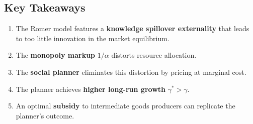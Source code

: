 \subsection{Key Takeaways}

\begin{enumerate}
    \item The Romer model features a \textbf{knowledge spillover externality} that
          leads to too little innovation in the market equilibrium.
    \item The \textbf{monopoly markup} $1/\alpha$ distorts resource allocation.
    \item The \textbf{social planner} eliminates this distortion by pricing at
          marginal cost.
    \item The planner achieves \textbf{higher long-run growth} $\gamma^* > \gamma$.
    \item An optimal \textbf{subsidy} to intermediate goods producers can
          replicate the planner's outcome.
\end{enumerate}

\clearpage


